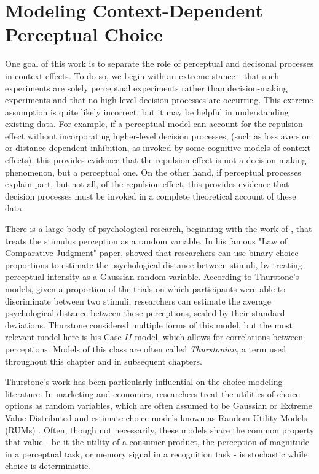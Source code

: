 \section{Modeling Context-Dependent Perceptual Choice}

One goal of this work is to separate the role of perceptual and decisonal processes in context effects. To do so, we begin with an extreme stance - that such experiments are solely perceptual experiments rather than decision-making experiments and that no high level decision processes are occurring. This extreme assumption is quite likely incorrect, but it may be helpful in understanding existing data. For example, if a perceptual model can account for the repulsion effect without incorporating higher-level decision processes, (such as loss aversion or distance-dependent inhibition, as invoked by some cognitive models of context effects), this provides evidence that the repulsion effect is not a decision-making phenomenon, but a perceptual one. On the other hand, if perceptual processes explain part, but not all, of the repulsion effect, this provides evidence that decision processes must be invoked in a complete theoretical account of these data.

There is a large body of psychological research, beginning with the work of \textcite{thurstone1927law}, that treats the stimulus perception as a random variable. In his famous "Law of Comparative Judgment" paper, \textcite{thurstone1927law} showed that researchers can use binary choice proportions to estimate the psychological distance between stimuli, by treating perceptual intensity as a Gaussian random variable. According to Thurstone's models, given a proportion of the trials on which participants were able to discriminate between two stimuli, researchers can estimate the average psychological distance between these perceptions, scaled by their standard deviations. Thurstone considered multiple forms of this model, but the most relevant model here is his Case $II$ model, which allows for correlations between perceptions. Models of this class are often called \textit{Thurstonian}, a term used throughout this chapter and in subsequent chapters.

Thurstone's work has been particularly influential on the choice modeling literature. In marketing and economics, researchers treat the utilities of choice options as random variables, which are often assumed to be Gaussian or Extreme Value Distributed and estimate choice models known as Random Utility Models (RUMs) \parencite{mcfadden2001economic,hausman1978conditional,train2009discrete}. Often, though not necessarily, these models share the common property that value - be it the utility of a consumer product, the perception of magnitude in a perceptual task, or memory signal in a recognition task - is stochastic while choice is deterministic.

